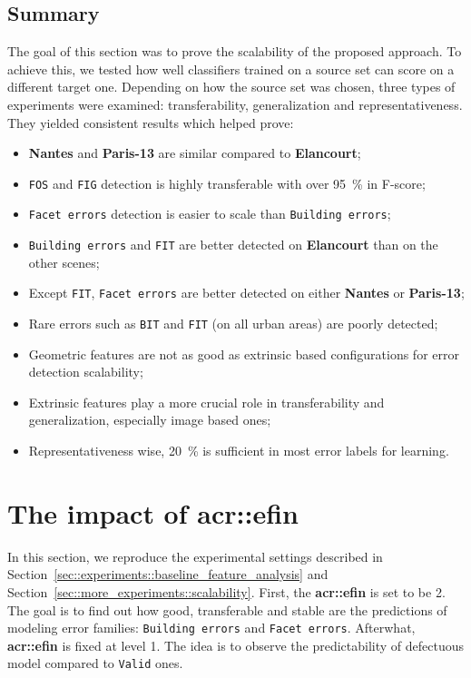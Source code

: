     \subsection{Summary}
        \label{subsec::more_experiments::scalability::summary}
        The goal of this section was to prove the scalability of the proposed approach.
        To achieve this, we tested how well classifiers trained on a source set can score on a different target one.
        Depending on how the source set was chosen, three types of experiments were examined: transferability, generalization and representativeness.
        They yielded consistent results which helped prove:
        \begin{itemize}[label=\(\blacktriangleright\)]
            \item \textbf{Nantes} and \textbf{Paris-13} are similar compared to \textbf{Elancourt};
            \item \texttt{FOS} and \texttt{FIG} detection is highly transferable with over \SI{95}{\percent} in F-score;
            \item \texttt{Facet errors} detection is easier to scale than \texttt{Building errors};
            \item \texttt{Building errors} and \texttt{FIT} are better detected on \textbf{Elancourt} than on the other scenes;
            \item Except \texttt{FIT}, \texttt{Facet errors} are better detected on either \textbf{Nantes} or \textbf{Paris-13};
            \item Rare errors such as \texttt{BIT} and \texttt{FIT} (on all urban areas) are poorly detected;
            \item Geometric features are not as good as extrinsic based configurations for error detection scalability;
            \item Extrinsic features play a more crucial role in transferability and generalization, especially image based ones;
            \item Representativeness wise, \SI{20}{\percent} is sufficient in most error labels for learning.
        \end{itemize}

\section{The impact of \texorpdfstring{\acrshort*{acr::efin}}{eFin}}
    \label{sec::more_experiments::finesse}
    In this section, we reproduce the experimental settings described in Section~\ref{sec::experiments::baseline_feature_analysis} and Section~\ref{sec::more_experiments::scalability}.
    First, the \textbf{\gls{acr::efin}} is set to be 2.
    The goal is to find out how good, transferable and stable are the predictions of modeling error families: \texttt{Building errors} and \texttt{Facet errors}.
    Afterwhat, \textbf{\gls{acr::efin}} is fixed at level 1.
    The idea is to observe the predictability of defectuous model compared to \texttt{Valid} ones.
    
